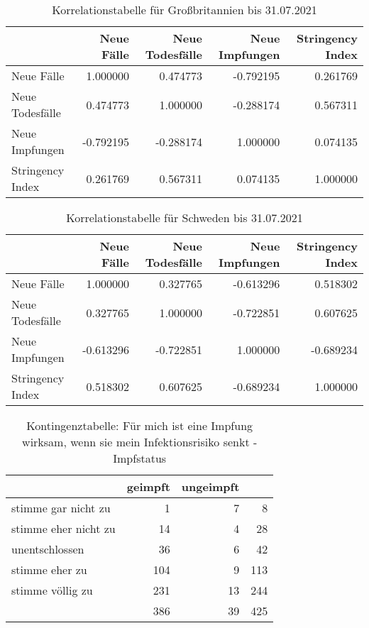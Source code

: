 \begin{table}[ht!]
    \centering
    \begin{tabular} {l | r r r r}
        & Neue Fälle & Neue Todesfälle & Neue Impfungen & Stringency Index \\
        \hline
        Neue Fälle & 1.000000 & 0.474773 & -0.792195 & 0.261769 \\
        Neue Todesfälle & 0.474773 & 1.000000 & -0.288174 & 0.567311 \\
        Neue Impfungen & -0.792195 & -0.288174 & 1.000000 & 0.074135 \\
        Stringency Index & 0.261769 & 0.567311 & 0.074135 & 1.000000 \\
    \end{tabular}
    \caption{Korrelationstabelle für Großbritannien bis 31.07.2021}
    \label{tab:corr_gbr}
\end{table}

\begin{table}[ht!]
    \centering
    \begin{tabular} {l | r r r r}
        & Neue Fälle & Neue Todesfälle & Neue Impfungen & Stringency Index \\
        \hline
        Neue Fälle & 1.000000 & 0.327765 & -0.613296 & 0.518302 \\
        Neue Todesfälle & 0.327765 & 1.000000 & -0.722851 & 0.607625 \\
        Neue Impfungen & -0.613296 & -0.722851 & 1.000000 & -0.689234 \\
        Stringency Index & 0.518302 & 0.607625 & -0.689234 & 1.000000 \\
    \end{tabular}
    \caption{Korrelationstabelle für Schweden bis 31.07.2021}
    \label{tab:corr_swe}
\end{table}


\begin{table}[ht!]
    \centering
    \begin{tabular} {l | r r | r}
        & geimpft & ungeimpft & \\
        \hline
        stimme gar nicht zu & 1 & 7 & 8 \\
        stimme eher nicht zu & 14 & 4 & 28 \\
        unentschlossen & 36 & 6 & 42 \\
        stimme eher zu & 104 & 9 & 113 \\
        stimme völlig zu & 231 & 13 & 244 \\
        \hline
        & 386 & 39 & 425 \\
    \end{tabular}
    \caption{Kontingenztabelle: Für mich ist eine Impfung wirksam, wenn sie mein Infektionsrisiko senkt - Impfstatus}
    \label{tab:chi_infektionsrisiko_impfstatus}
\end{table}


